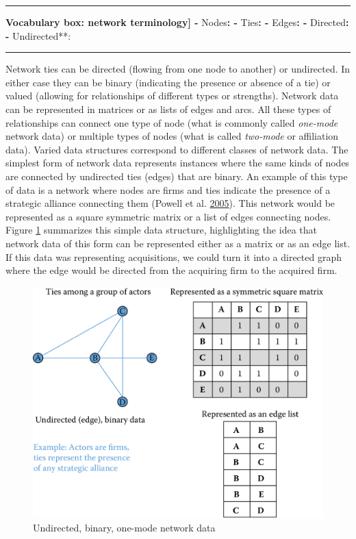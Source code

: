 \documentclass[]{krantz}
\begin{document}
\begin{center}\rule{0.5\linewidth}{\linethickness}\end{center}

\textbf{Vocabulary box: network terminology{]} - }Nodes\textbf{: -
}Ties\textbf{: - }Edges\textbf{: - }Directed\textbf{: - }Undirected**:

\begin{center}\rule{0.5\linewidth}{\linethickness}\end{center}

Network ties can be directed (flowing from one node to another) or
undirected. In either case they can be binary (indicating the presence
or absence of a tie) or valued (allowing for relationships of different
types or strengths). Network data can be represented in matrices or as
lists of edges and arcs. All these types of relationships can connect
one type of node (what is commonly called \emph{one-mode} network data)
or multiple types of nodes (what is called \emph{two-mode} or
affiliation data). Varied data structures correspond to different
classes of network data. The simplest form of network data represents
instances where the same kinds of nodes are connected by undirected ties
(edges) that are binary. An example of this type of data is a network
where nodes are firms and ties indicate the presence of a strategic
alliance connecting them (Powell et al.
\protect\hyperlink{ref-powell2005network}{2005}). This network would be
represented as a square symmetric matrix or a list of edges connecting
nodes. Figure \ref{fig:fig8-1} summarizes this simple data structure,
highlighting the idea that network data of this form can be represented
either as a matrix or as an edge list. If this data was representing
acquisitions, we could turn it into a directed graph where the edge
would be directed from the acquiring firm to the acquired firm.

\begin{figure}

{\centering \includegraphics[width=0.7\linewidth]{ChapterNetworks/figures/fig8-1} 

}

\caption{Undirected, binary, one-mode network data}\label{fig:fig8-1}
\end{figure}
\end{document}
